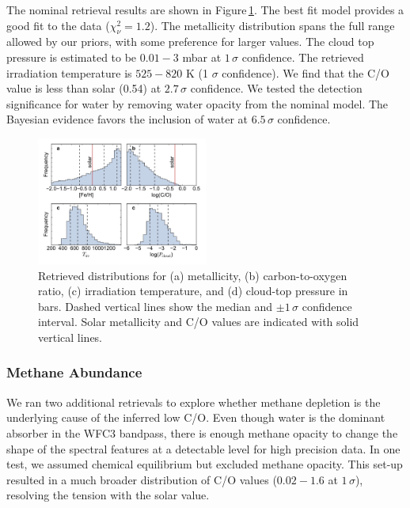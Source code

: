 \documentclass[twocolumn]{aastex61}
\begin{document}

The nominal retrieval results are shown in Figure\,\ref{fig:retrieval}.  The best fit model provides a good fit to the data ($\chi^2_\nu = 1.2$).  The metallicity distribution spans the full range allowed by our priors, with some preference for larger values. The cloud top pressure is estimated to be $0.01 - 3$ mbar at $1\,\sigma$ confidence. The retrieved irradiation temperature is $525 - 820$ K (1 $\sigma$ confidence).  We find that the C/O value is less than solar (0.54) at $2.7\,\sigma$ confidence.  We tested the detection significance for water by removing water opacity from the nominal model. The Bayesian evidence favors the inclusion of water at $6.5\,\sigma$ confidence. 

\begin{figure}
\includegraphics[width = 0.5\textwidth]{Figures/retrieval.pdf}
\caption{Retrieved distributions for (a) metallicity, (b) carbon-to-oxygen ratio, (c) irradiation temperature, and (d) cloud-top pressure in bars. Dashed vertical lines show the median and $\pm1\,\sigma$ confidence interval. Solar metallicity and C/O values are indicated with solid vertical lines.}  \label{fig:retrieval}
\end{figure}

\subsubsection{Methane Abundance}
We ran two additional retrievals to explore whether methane depletion is the underlying cause of the inferred low C/O.  Even though water is the dominant absorber in the WFC3 bandpass, there is enough methane opacity to change the shape of the spectral features at a detectable level for high precision data.  In one test, we assumed chemical equilibrium but excluded methane opacity. This set-up resulted in a much broader distribution of C/O values ($0.02 - 1.6$ at $1\,\sigma$), resolving the tension with the solar value. 
\end{document}
